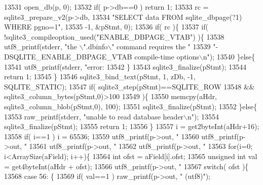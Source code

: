 \begin{DoxyCode}
{{{{{13531   open_db(p, 0);
13532   \textcolor{keywordflow}{if}( p->db==0 ) \textcolor{keywordflow}{return} 1;
13533   rc = sqlite3_prepare_v2(p->db,
13534              \textcolor{stringliteral}{"SELECT data FROM sqlite\_dbpage(?1) WHERE pgno=1"},
13535              -1, &pStmt, 0);
13536   \textcolor{keywordflow}{if}( rc )\{
13537     \textcolor{keywordflow}{if}( !sqlite3_compileoption_used(\textcolor{stringliteral}{"ENABLE\_DBPAGE\_VTAB"}) )\{
13538       utf8_printf(stderr, \textcolor{stringliteral}{"the \(\backslash\)".dbinfo\(\backslash\)" command requires the "}
13539                           \textcolor{stringliteral}{"-DSQLITE\_ENABLE\_DBPAGE\_VTAB compile-time options\(\backslash\)n"});
13540     \}\textcolor{keywordflow}{else}\{
13541       utf8_printf(stderr, \textcolor{stringliteral}{"error: %
13542     \}
13543     sqlite3_finalize(pStmt);
13544     \textcolor{keywordflow}{return} 1;
13545   \}
13546   sqlite3_bind_text(pStmt, 1, zDb, -1, SQLITE_STATIC);
13547   \textcolor{keywordflow}{if}( sqlite3_step(pStmt)==SQLITE_ROW
13548    && sqlite3_column_bytes(pStmt,0)>100
13549   )\{
13550     memcpy(aHdr, sqlite3_column_blob(pStmt,0), 100);
13551     sqlite3_finalize(pStmt);
13552   \}\textcolor{keywordflow}{else}\{
13553     raw_printf(stderr, \textcolor{stringliteral}{"unable to read database header\(\backslash\)n"});
13554     sqlite3_finalize(pStmt);
13555     \textcolor{keywordflow}{return} 1;
13556   \}
13557   i = get2byteInt(aHdr+16);
13558   \textcolor{keywordflow}{if}( i==1 ) i = 65536;
13559   utf8_printf(p->out, \textcolor{stringliteral}{"%
13560   utf8_printf(p->out, \textcolor{stringliteral}{"%
13561   utf8_printf(p->out, \textcolor{stringliteral}{"%
13562   utf8_printf(p->out, \textcolor{stringliteral}{"%
13563   \textcolor{keywordflow}{for}(i=0; i<ArraySize(aField); i++)\{
13564     \textcolor{keywordtype}{int} ofst = aField[i].ofst;
13565     \textcolor{keywordtype}{unsigned} \textcolor{keywordtype}{int} val = get4byteInt(aHdr + ofst);
13566     utf8_printf(p->out, \textcolor{stringliteral}{"%
13567     \textcolor{keywordflow}{switch}( ofst )\{
13568       \textcolor{keywordflow}{case} 56: \{
13569         \textcolor{keywordflow}{if}( val==1 ) raw_printf(p->out, \textcolor{stringliteral}{" (utf8)"});
}}}}}}}}}}}
\end{DoxyCode}
